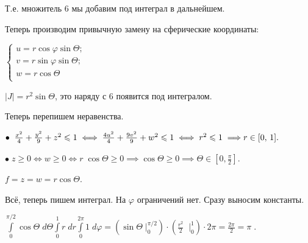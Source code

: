 \documentclass[a4paper, fleqn]{article}
\begin{document}
    Т.е. множитель $6$ мы добавим под интеграл в дальнейшем.
    
    Теперь производим привычную замену на сферические координаты:
    
    
    $\begin{cases}
    u = r \cos \varphi \sin \Theta;\\
    v = r \sin \varphi \sin \Theta;\\
    w = r  \cos \Theta\\
    \end{cases}$
    
    $|J| = r^2 \sin \Theta$, это наряду с 6 появится под интегралом.
    
    Теперь перепишем неравенства.
    
    $\bullet \; \; \frac{x^2}{4} + \frac{y^2}{9} + z^2 \leq 1 \iff \frac{4 u^2}{4} + \frac{9 v^2}{9} + w^2 \leq 1 \iff r^2 \leq 1 \implies  \\ r \in [0, \, 1].$ 
    
    $\bullet \; z \geq 0 \iff w \geq 0 \iff r \; \cos \Theta \geq 0 \implies \cos \Theta \geq 0 \implies \Theta \in \left[0, \frac{\pi}{2}\right].$
    
    $f = z = w = r \cos \Theta.$
    
    Всё, теперь пишем интеграл. На $\varphi$ ограничений нет. Сразу выносим константы.
    
    $\displaystyle \int\limits_{0}^{\pi / 2}  \cos \Theta \; d \Theta \int \limits_{0}^{1} r\;  dr \int\limits_{0}^{2 \pi} 1\;  d \varphi  =  \left( \sin \Theta \; \Bigg|_{0}^{\pi/2}\right) \cdot \left(\frac{r^2}{2} \;  \; \Bigg|_{0}^{1} \right) \cdot 2 \pi= \frac{2 \pi}{2} = \boxed{\pi} \; .$
    
    
    
    
    
    
    
    
    
\end{document}
